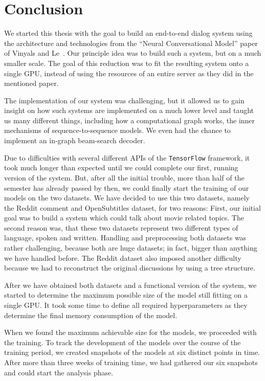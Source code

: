 \chapter{Conclusion}

We started this thesis with the goal to build an end-to-end dialog system using the architecture and technologies from the ``Neural Conversational Model'' paper of Vinyals and Le~\cite{Vinyals:2015}. Our principle idea was to build such a system, but on a much smaller scale. The goal of this reduction was to fit the resulting system onto a single GPU, instead of using the resources of an entire server as they did in the mentioned paper.

The implementation of our system was challenging, but it allowed us to gain insight on how such systems are implemented on a much lower level and taught us many different things, including how a computational graph works, the inner mechanisms of sequence-to-sequence models. We even had the chance to implement an in-graph beam-search decoder.

Due to difficulties with several different APIs of the \texttt{TensorFlow} framework, it took much longer than expected until we could complete our first, running version of the system. But, after all the initial trouble, more than half of the semester has already passed by then, we could finally start the training of our models on the two datasets. We have decided to use this two datasets, namely the Reddit comment and OpenSubtitles dataset, for two reasons: First, our initial goal was to build a system which could talk about movie related topics. The second reason was, that these two datasets represent two different types of language, spoken and written. Handling and preprocessing both datasets was rather challenging, because both are huge datasets; in fact, bigger than anything we have handled before. The Reddit dataset also imposed another difficulty because we had to reconstruct the original discussions by using a tree structure.

After we have obtained both datasets and a functional version of the system, we started to determine the maximum possible size of the model still fitting on a single GPU. It took some time to define all required hyperparameters as they determine the final memory consumption of the model.

When we found the maximum achievable size for the models, we proceeded with the training. To track the development of the models over the course of the training period, we created snapshots of the models at six distinct points in time. After more than three weeks of training time, we had gathered our six snapshots and could start the analysis phase.

